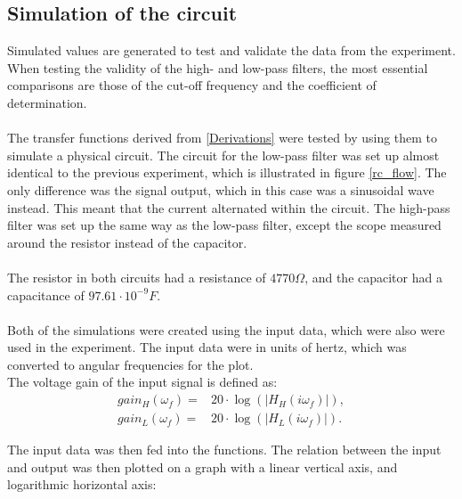 \subsection{Simulation of the circuit}
Simulated values are generated to test and validate the data from the experiment. When testing the validity of the high- and low-pass filters, the most essential comparisons are those of the cut-off frequency and the coefficient of determination. 
\\ \\
The transfer functions derived from \cref{Derivations} were tested by using them to simulate a physical circuit. The circuit for the low-pass filter was set up almost identical to the previous experiment, which is illustrated in figure \ref{rc_flow}. The only difference was the signal output, which in this case was a sinusoidal wave instead. This meant that the current alternated within the circuit. The high-pass filter was set up the same way as the low-pass filter, except the scope measured around the resistor instead of the capacitor.
\\
\\
The resistor in both circuits had a resistance of $4770 \Omega$, and the capacitor had a capacitance of $97.61\cdot 10^{-9} F$. 
\\
\\
Both of the simulations were created using the input data, which were also were used in the experiment. The input data were in units of hertz, which was converted to angular frequencies for the plot.
\\
The voltage gain of the input signal is defined as:
\begin{align*}
	gain_H(\omega _f) =&20 \cdot \log{\left( \left|H_{H}(i \omega_f)\right| \right)},
	\\
	gain_L(\omega _f) =&20 \cdot \log{\left( \left|H_{L}(i \omega_f)\right| \right)}.
\end{align*}

\noindent The input data was then fed into the functions. The relation between the input and output was then plotted on a graph with a linear vertical axis, and logarithmic horizontal axis:

